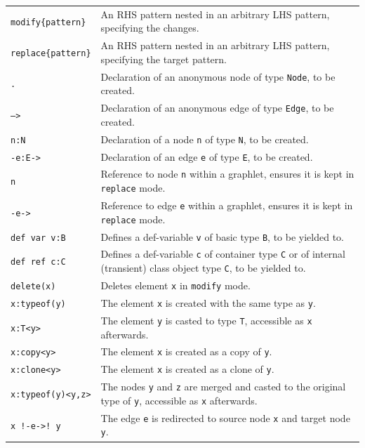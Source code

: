 \begin{table}[htbp]
\begin{minipage}{\linewidth} \renewcommand{\footnoterule}{} 
\begin{tabularx}{\linewidth}{|lX|}
\hline
\texttt{modify\{pattern\}}	& An RHS pattern nested in an arbitrary LHS pattern, specifying the changes. \\
\texttt{replace\{pattern\}}	& An RHS pattern nested in an arbitrary LHS pattern, specifying the target pattern. \\
\hline
\texttt{.}	& Declaration of an anonymous node of type \texttt{Node}, to be created. \\
\texttt{-->}	& Declaration of an anonymous edge of type \texttt{Edge}, to be created. \\
\texttt{n:N} & Declaration of a node \texttt{n} of type \texttt{N}, to be created.\\
\texttt{-e:E->} & Declaration of an edge \texttt{e} of type \texttt{E}, to be created.\\
\texttt{n} & Reference to node \texttt{n} within a graphlet, ensures it is kept in \texttt{replace} mode.\\
\texttt{-e->} & Reference to edge \texttt{e} within a graphlet, ensures it is kept in \texttt{replace} mode.\\
\texttt{def var v:B}	& Defines a def-variable \texttt{v} of basic type \texttt{B}, to be yielded to.\\
\texttt{def ref c:C}	& Defines a def-variable \texttt{c} of container type \texttt{C} or of internal (transient) class object type \texttt{C}, to be yielded to.\\
\texttt{delete(x)} & Deletes element \texttt{x} in \texttt{modify} mode.\\
\hline
\texttt{x:typeof(y)} & The element \texttt{x} is created with the same type as \texttt{y}.\\
\texttt{x:T<y>} & The element \texttt{y} is casted to type \texttt{T}, accessible as \texttt{x} afterwards.\\
\texttt{x:copy<y>} & The element \texttt{x} is created as a copy of \texttt{y}.\\
\texttt{x:clone<y>} & The element \texttt{x} is created as a clone of \texttt{y}.\\
\texttt{x:typeof(y)<y,z>} & The nodes \texttt{y} and \texttt{z} are merged and casted to the original type of \texttt{y}, accessible as \texttt{x} afterwards.\\
\texttt{x !-e->! y} & The edge \texttt{e} is redirected to source node \texttt{x} and target node \texttt{y}.\\

\end{tabularx}
\end{minipage}
\end{table}

